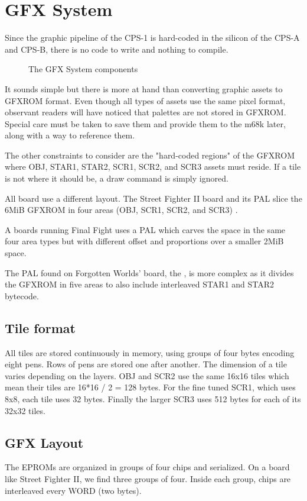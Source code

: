 \chapter{GFX System}
Since the graphic pipeline of the CPS-1 is hard-coded in the silicon of the CPS-A and CPS-B, there is no code to write and nothing to compile. 

\begin{figure}[H]
\caption*{The GFX System components}
\end{figure}

It sounds simple but there is more at hand than converting graphic assets to GFXROM format. Even though all types of assets use the same pixel format, observant readers will have noticed that palettes are not stored in GFXROM. Special care must be taken to save them and provide them to the m68k later, along with a way to reference them.

The other constraints to consider are the "hard-coded regions" of the GFXROM where OBJ, STAR1, STAR2, SCR1, SCR2, and SCR3 assets must reside. If a tile is not where it should be, a draw command is simply ignored.

All board use a different layout. The Street Fighter II board and its  PAL slice the 6MiB GFXROM in four areas (OBJ, SCR1, SCR2, and SCR3) . 

A boards running Final Fight uses a  PAL which carves the space in the same four area types but with different offset and proportions over a smaller 2MiB space. 

The PAL found on Forgotten Worlds' board, the , is more complex as it divides the GFXROM in five areas to also include interleaved STAR1 and STAR2 bytecode.


\section{Tile format}
All tiles are stored continuously in memory, using groups of four bytes encoding eight pens. Rows of pens are stored one after another. The dimension of a tile varies depending on the layers. OBJ and SCR2 use the same 16x16 tiles which mean their tiles are 16*16 / 2 = 128 bytes. For the fine tuned SCR1, which uses 8x8, each tile uses 32 bytes. Finally the larger SCR3 uses 512 bytes for each of its 32x32 tiles.

\section{GFX Layout}
The EPROMs are organized in groups of four chips and serialized. On a board like Street Fighter II, we find three groups of four. Inside each group, chips are interleaved every WORD (two bytes).

